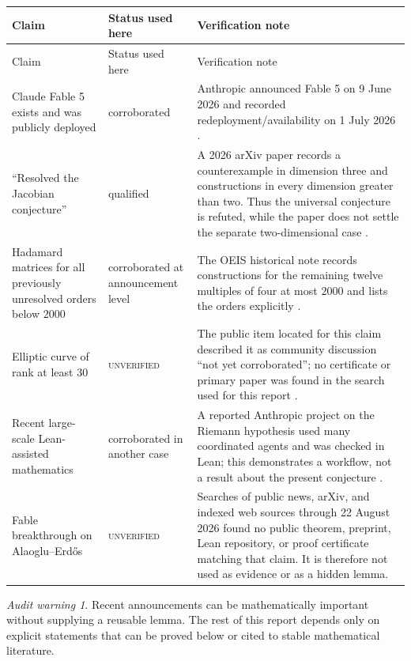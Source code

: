 \documentclass[11pt]{article}
\theoremstyle{definition}
\theoremstyle{remark}
\newtheorem{warning}[theorem]{Audit warning}
\newcommand{\statusunverified}{\textcolor{deepred}{\textsc{unverified}}}
\begin{document}
\begin{longtable}{>{\raggedright\arraybackslash}p{}>{\raggedright\arraybackslash}p{}>{\raggedright\arraybackslash}p{}}
\toprule
Claim & Status used here & Verification note \\
\midrule
\endfirsthead
\toprule
Claim & Status used here & Verification note \\
\midrule
\endhead
Claude Fable 5 exists and was publicly deployed & corroborated & Anthropic announced
Fable 5 on 9 June 2026 and recorded redeployment/availability on 1 July 2026
\cite{AnthropicFable2026}.\\

``Resolved the Jacobian conjecture'' & qualified & A 2026 arXiv paper records a
counterexample in dimension three and constructions in every dimension greater than
two.  Thus the universal conjecture is refuted, while the paper does not settle the
separate two-dimensional case \cite{Gao2026}.\\

Hadamard matrices for all previously unresolved orders below $2000$ & corroborated
at announcement level & The OEIS historical note records constructions for the
remaining twelve multiples of four at most $2000$ and lists the orders explicitly
\cite{OEISHadamard2026}.\\

Elliptic curve of rank at least $30$ & \statusunverified & The public item located
for this claim described it as community discussion ``not yet corroborated''; no
certificate or primary paper was found in the search used for this report
\cite{Rank30Signal2026}.\\

Recent large-scale Lean-assisted mathematics & corroborated in another case & A
reported Anthropic project on the Riemann hypothesis used many coordinated agents
and was checked in Lean; this demonstrates a workflow, not a result about the present
conjecture \cite{TechCrunchLean2026}.\\

Fable breakthrough on Alaoglu--Erd\H{o}s & \statusunverified & Searches of public
news, arXiv, and indexed web sources through 22 August 2026 found no public theorem,
preprint, Lean repository, or proof certificate matching that claim.  It is therefore
not used as evidence or as a hidden lemma.\\
\bottomrule
\end{longtable}

\begin{warning}
Recent announcements can be mathematically important without supplying a reusable
lemma.  The rest of this report depends only on explicit statements that can be
proved below or cited to stable mathematical literature.
\end{warning}
\end{document}
